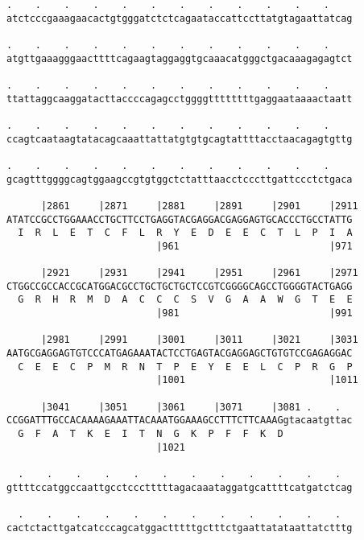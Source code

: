 \documentclass{article}
\begin{document}
\begin{Verbatim}
.    .    .    .    .    .    .    .    .    .    .    .    
atctcccgaaagaacactgtgggatctctcagaataccattccttatgtagaattatcag
                                                            
.    .    .    .    .    .    .    .    .    .    .    .    
atgttgaaagggaacttttcagaagtaggaggtgcaaacatgggctgacaaagagagtct
                                                            
.    .    .    .    .    .    .    .    .    .    .    .    
ttattaggcaaggatacttaccccagagcctggggttttttttgaggaataaaactaatt
                                                            
.    .    .    .    .    .    .    .    .    .    .    .    
ccagtcaataagtatacagcaaattattatgtgtgcagtattttacctaacagagtgttg
                                                            
.    .    .    .    .    .    .    .    .    .    .    .    
gcagtttggggcagtggaagccgtgtggctctatttaacctcccttgattccctctgaca
                                                            
      |2861     |2871     |2881     |2891     |2901     |2911
ATATCCGCCTGGAAACCTGCTTCCTGAGGTACGAGGACGAGGAGTGCACCCTGCCTATTG
  I  R  L  E  T  C  F  L  R  Y  E  D  E  E  C  T  L  P  I  A
                          |961                          |971
  
      |2921     |2931     |2941     |2951     |2961     |2971
CTGGCCGCCACCGCATGGACGCCTGCTGCTGCTCCGTCGGGGCAGCCTGGGGTACTGAGG
  G  R  H  R  M  D  A  C  C  C  S  V  G  A  A  W  G  T  E  E
                          |981                          |991
  
      |2981     |2991     |3001     |3011     |3021     |3031
AATGCGAGGAGTGTCCCATGAGAAATACTCCTGAGTACGAGGAGCTGTGTCCGAGAGGAC
  C  E  E  C  P  M  R  N  T  P  E  Y  E  E  L  C  P  R  G  P
                          |1001                         |1011
  
      |3041     |3051     |3061     |3071     |3081 .    .  
CCGGATTTGCCACAAAAGAAATTACAAATGGAAAGCCTTTCTTCAAAGgtacaatgttac
  G  F  A  T  K  E  I  T  N  G  K  P  F  F  K  D            
                          |1021                             
  
  .    .    .    .    .    .    .    .    .    .    .    .  
gttttccatggccaattgcctccctttttagacaaataggatgcattttcatgatctcag
                                                            
  .    .    .    .    .    .    .    .    .    .    .    .  
cactctacttgatcatcccagcatggactttttgctttctgaattatataattatctttg
                                                            

\end{Verbatim}
\end{document}
